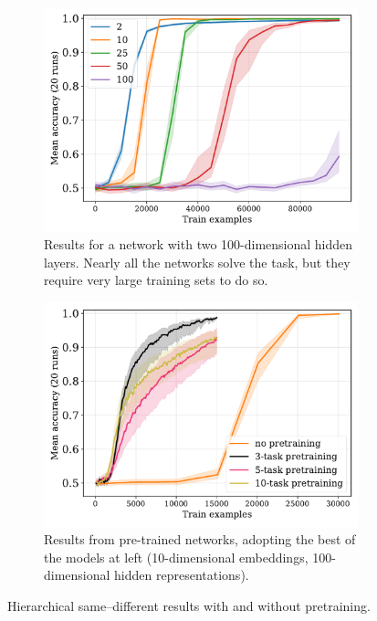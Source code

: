 \documentclass{article}
\begin{document}
\begin{figure}[tp]
\centering
\begin{subfigure}[t]{0.48\linewidth}
 \centering
 \includegraphics[width=1\linewidth]{./flatpremack-h2-train_size-embed_dim-hidden_dim=100.pdf}
 \caption{Results for a network with two 100-dimensional hidden layers. Nearly all the networks solve the task, but they require very large training sets to do so.}
 \label{fig:premack-h2-flat-results}
\end{subfigure}
\hfill
\begin{subfigure}[t]{0.48\linewidth}
 \centering
 \includegraphics[width=1\linewidth]{./flatpremack-h2-pretrain-compare-train_size-pretrained-embed_dim=None.pdf}
 \caption{Results from pre-trained networks, adopting the best of the models at left (10-dimensional embeddings, 100-dimensional hidden representations).}
 \label{fig:premack-h2-pretrain}
\end{subfigure}
\caption{Hierarchical same--different results with and without pretraining.}
\end{figure}
\end{document}
